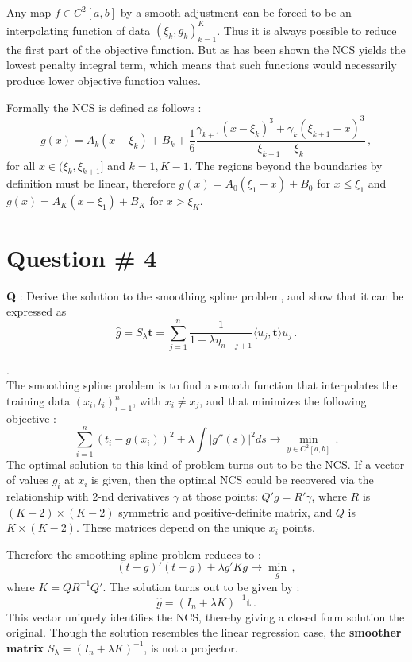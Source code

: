 \documentclass[a4paper]{article}
\begin{document}
Any map $f\in C^2[a,b]$ by a smooth adjustment can be forced to be an interpolating
function of data $(\xi_k, g_k)_{k=1}^K$. Thus it is always possible to reduce the
first part of the objective function. But as has been shown the NCS yields the lowest
penalty integral term, which means that such functions would necessarily produce
lower objective function values.

Formally the NCS is defined as follows :
\[
g(x)
= A_k(x - \xi_k) + B_k + \frac{1}{6}
	\frac{\gamma_{k+1}(x-\xi_k)^3+\gamma_k(\xi_{k+1}-x)^3}{\xi_{k+1}-\xi_k}\,,
\]
for all $x\in (\xi_k,\xi_{k+1}]$ and $k=1, K-1$. The regions beyond the boundaries
by definition must be linear, therefore $g(x) = A_0 (\xi_1-x) + B_0$ for $x\leq \xi_1$
and $g(x) = A_K (x-\xi_1) + B_K$ for $x > \xi_K$.


\clearpage

\section[Smoothing spline]{Question \# 4} %
\label{sec:question_4}
\textbf{\large \textbf{Q}} : Derive the solution to the smoothing spline problem,
and show that it can be expressed as
\[ \hat{g} = S_\lambda \mathbf{t} = \sum_{j=1}^n \frac{1}{1+\lambda \eta_{n-j+1}} \langle u_j, \mathbf{t} \rangle u_j \,. \]

 .\hfill\\
The smoothing spline problem is to find a smooth function that interpolates the
training data $(x_i,t_i)_{i=1}^n$, with $x_i\neq x_j$, and that minimizes the following
objective :
\[
\sum_{i=1}^n (t_i - g(x_i))^2 + \lambda \int |g''(s)|^2 ds \to \min_{y\in C^2[a,b]}\,.
\]
The optimal solution to this kind of problem turns out to be the NCS. If a vector
of values $g_i$ at $x_i$ is given, then the optimal NCS could be recovered via the
relationship with $2$-nd derivatives $\gamma$ at those points: $Q'g = R'\gamma$,
where $R$ is $(K-2)\times(K-2)$ symmetric and positive-definite matrix, and $Q$
is $K\times(K-2)$. These matrices depend on the unique $x_i$ points.

Therefore the smoothing spline problem reduces to :
\[ (t - g)'(t - g) + \lambda g'K g \to \min_g \,,\]
where $K = Q R^{-1} Q'$. The solution turns out to be given by :
\[ \hat{g} = (I_n + \lambda K)^{-1} \mathbf{t} \,. \]
This vector uniquely identifies the NCS, thereby giving a closed form solution 
the original. Though the solution resembles the linear regression case, the \textbf{
smoother matrix} $S_\lambda = (I_n + \lambda K)^{-1}$, is not a projector.
\end{document}
